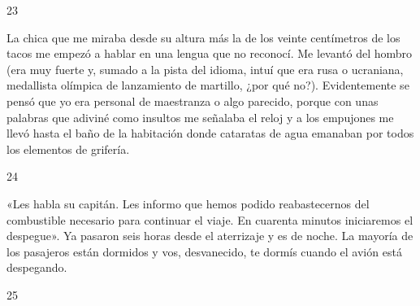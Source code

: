 \documentclass[12pt,twoside,openright,a5paper]{book}
\begin{document}
\vspace{0.5cm}

\hrulefill \hspace{0.1cm}\decofourleft\hspace{0.2cm} 23 \hspace{0.2cm}\decofourright \hspace{0.1cm}\hrulefill

\nopagebreak

\vspace{0.5cm}

\nopagebreak

La chica que me miraba desde su altura más la de los veinte centímetros de
los tacos me empezó a hablar en una lengua que no reconocí. Me levantó
del hombro (era muy fuerte y, sumado a la pista del idioma, intuí que era rusa o
ucraniana, medallista olímpica de lanzamiento de martillo, ¿por qué
no?). Evidentemente se pensó que yo era personal de maestranza o algo
parecido, porque con unas palabras que adiviné como insultos me señalaba
el reloj y a los empujones me llevó hasta el baño de la habitación donde
cataratas de agua emanaban por todos los elementos de grifería.

\vspace{0.5cm}

\hrulefill \hspace{0.1cm}\decofourleft\hspace{0.2cm} 24 \hspace{0.2cm}\decofourright \hspace{0.1cm}\hrulefill

\nopagebreak

\vspace{0.5cm}

\nopagebreak

«Les habla su capitán. Les informo que hemos podido reabastecernos
del combustible necesario para continuar el viaje. En cuarenta minutos
iniciaremos el despegue».
Ya pasaron seis horas desde el aterrizaje y es
de noche. La mayoría de los pasajeros están dormidos y vos, desvanecido,
te dormís cuando el avión está despegando.

\vspace{0.5cm}

\hrulefill \hspace{0.1cm}\decofourleft\hspace{0.2cm} 25 \hspace{0.2cm}\decofourright \hspace{0.1cm}\hrulefill
\end{document}
